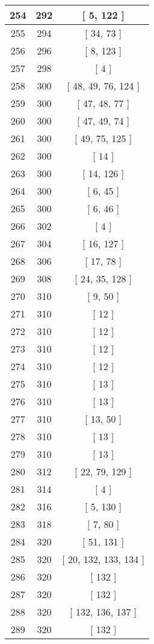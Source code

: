 \begin{center}
\begin{longtable}[H]{|| c c c ||}
\hline
254 & 292 & [ 5, 122 ] \\ 
\hline
255 & 294 & [ 34, 73 ] \\ 
\hline
256 & 296 & [ 8, 123 ] \\ 
\hline
257 & 298 & [ 4 ] \\ 
\hline
258 & 300 & [ 48, 49, 76, 124 ] \\ 
\hline
259 & 300 & [ 47, 48, 77 ] \\ 
\hline
260 & 300 & [ 47, 49, 74 ] \\ 
\hline
261 & 300 & [ 49, 75, 125 ] \\ 
\hline
262 & 300 & [ 14 ] \\ 
\hline
263 & 300 & [ 14, 126 ] \\ 
\hline
264 & 300 & [ 6, 45 ] \\ 
\hline
265 & 300 & [ 6, 46 ] \\ 
\hline
266 & 302 & [ 4 ] \\ 
\hline
267 & 304 & [ 16, 127 ] \\ 
\hline
268 & 306 & [ 17, 78 ] \\ 
\hline
269 & 308 & [ 24, 35, 128 ] \\ 
\hline
270 & 310 & [ 9, 50 ] \\ 
\hline
271 & 310 & [ 12 ] \\ 
\hline
272 & 310 & [ 12 ] \\ 
\hline
273 & 310 & [ 12 ] \\ 
\hline
274 & 310 & [ 12 ] \\ 
\hline
275 & 310 & [ 13 ] \\ 
\hline
276 & 310 & [ 13 ] \\ 
\hline
277 & 310 & [ 13, 50 ] \\ 
\hline
278 & 310 & [ 13 ] \\ 
\hline
279 & 310 & [ 13 ] \\ 
\hline
280 & 312 & [ 22, 79, 129 ] \\ 
\hline
281 & 314 & [ 4 ] \\ 
\hline
282 & 316 & [ 5, 130 ] \\ 
\hline
283 & 318 & [ 7, 80 ] \\ 
\hline
284 & 320 & [ 51, 131 ] \\ 
\hline
285 & 320 & [ 20, 132, 133, 134 ] \\ 
\hline
286 & 320 & [ 132 ] \\ 
\hline
287 & 320 & [ 132 ] \\ 
\hline
288 & 320 & [ 132, 136, 137 ] \\ 
\hline
289 & 320 & [ 132 ] \\ 

\end{longtable}
\end{center}
